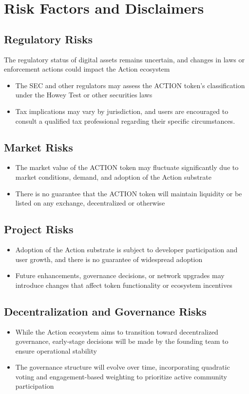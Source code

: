\section{Risk Factors and Disclaimers}

\subsection{Regulatory Risks}
The regulatory status of digital assets remains uncertain, and changes in laws or enforcement actions could impact the Action ecosystem
\begin{itemize}
\item The SEC and other regulators may assess the ACTION token's classification under the Howey Test or other securities laws
\item Tax implications may vary by jurisdiction, and users are encouraged to consult a qualified tax professional regarding their specific circumstances.
\end{itemize}

\subsection{Market Risks}
\begin{itemize}
\item The market value of the ACTION token may fluctuate significantly due to market conditions, demand, and adoption of the Action substrate
\item There is no guarantee that the ACTION token will maintain liquidity or be listed on any exchange, decentralized or otherwise
\end{itemize}

\subsection{Project Risks}
\begin{itemize}
\item Adoption of the Action substrate is subject to developer participation and user growth, and there is no guarantee of widespread adoption
\item Future enhancements, governance decisions, or network upgrades may introduce changes that affect token functionality or ecosystem incentives
\end{itemize}

\subsection{Decentralization and Governance Risks}
\begin{itemize}
\item While the Action ecosystem aims to transition toward decentralized governance, early-stage decisions will be made by the founding team to ensure operational stability
\item The governance structure will evolve over time, incorporating quadratic voting and engagement-based weighting to prioritize active community participation
\end{itemize}
